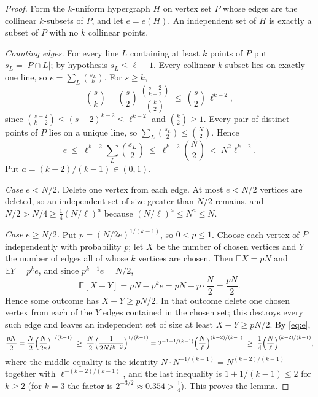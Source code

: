 \documentclass[11pt,a4paper]{article}
\theoremstyle{plain}
\theoremstyle{definition}
\theoremstyle{remark}
\newcommand{\E}{\mathbb E}
\begin{document}
\label{pf:alt}
\lemalt*
\begin{proof}
Form the $k$-uniform hypergraph $H$ on vertex set $P$ whose edges are the collinear $k$-subsets of $P$, and let $e=e(H)$. An independent set of $H$ is exactly a subset of $P$ with no $k$ collinear points.

\emph{Counting edges.} For every line $L$ containing at least $k$ points of $P$ put $s_L=|P\cap L|$; by hypothesis $s_L\le\ell-1$. Every collinear $k$-subset lies on exactly one line, so $e=\sum_L\binom{s_L}{k}$. For $s\ge k$,
\[
 \binom sk=\binom s2\,\frac{\binom{s-2}{k-2}}{\binom k2}\ \le\ \binom s2\,\ell^{k-2},
\]
since $\binom{s-2}{k-2}\le(s-2)^{k-2}\le\ell^{k-2}$ and $\binom k2\ge1$. Every pair of distinct points of $P$ lies on a unique line, so $\sum_L\binom{s_L}2\le\binom N2$. Hence
\begin{equation}\label{eq:e}
 e\ \le\ \ell^{k-2}\sum_L\binom{s_L}2\ \le\ \ell^{k-2}\binom N2\ <\ N^2\ell^{k-2}.
\end{equation}
Put $a=(k-2)/(k-1)\in(0,1)$.

\emph{Case $e<N/2$.} Delete one vertex from each edge. At most $e<N/2$ vertices are deleted, so an independent set of size greater than $N/2$ remains, and $N/2>N/4\ge\frac14(N/\ell)^a$ because $(N/\ell)^a\le N^a\le N$.

\emph{Case $e\ge N/2$.} Put $p=(N/2e)^{1/(k-1)}$, so $0<p\le1$. Choose each vertex of $P$ independently with probability $p$; let $X$ be the number of chosen vertices and $Y$ the number of edges all of whose $k$ vertices are chosen. Then $\E X=pN$ and $\E Y=p^ke$, and since $p^{k-1}e=N/2$,
\[
 \E[X-Y]=pN-p^ke=pN-p\cdot\frac N2=\frac{pN}2 .
\]
Hence some outcome has $X-Y\ge pN/2$. In that outcome delete one chosen vertex from each of the $Y$ edges contained in the chosen set; this destroys every such edge and leaves an independent set of size at least $X-Y\ge pN/2$. By \eqref{eq:e},
\[
 \frac{pN}2=\frac N2\Bigl(\frac N{2e}\Bigr)^{1/(k-1)}
 \ \ge\ \frac N2\Bigl(\frac1{2N\ell^{k-2}}\Bigr)^{1/(k-1)}
 =2^{-1-1/(k-1)}\Bigl(\frac N\ell\Bigr)^{(k-2)/(k-1)}
 \ \ge\ \frac14\Bigl(\frac N\ell\Bigr)^{(k-2)/(k-1)},
\]
where the middle equality is the identity $N\cdot N^{-1/(k-1)}=N^{(k-2)/(k-1)}$ together with $\ell^{-(k-2)/(k-1)}$, and the last inequality is $1+1/(k-1)\le2$ for $k\ge2$ (for $k=3$ the factor is $2^{-3/2}\approx0.354>\frac14$). This proves the lemma.
\end{proof}
\end{document}
